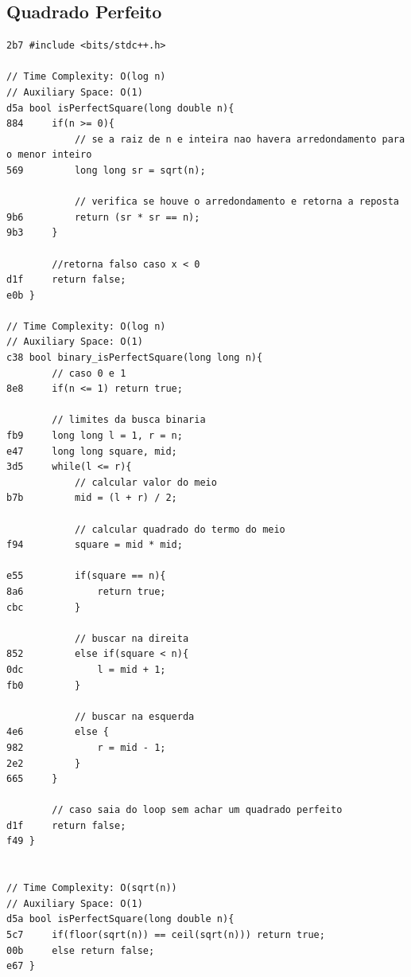 \documentclass[11pt, a4paper, twoside]{article}
\begin{document}
\subsection{Quadrado Perfeito}
\begin{lstlisting}
2b7 #include <bits/stdc++.h>

// Time Complexity: O(log n)
// Auxiliary Space: O(1)
d5a bool isPerfectSquare(long double n){
884     if(n >= 0){
            // se a raiz de n e inteira nao havera arredondamento para o menor inteiro
569         long long sr = sqrt(n);
    
            // verifica se houve o arredondamento e retorna a reposta
9b6         return (sr * sr == n);
9b3     }
    
        //retorna falso caso x < 0
d1f     return false;
e0b }

// Time Complexity: O(log n)
// Auxiliary Space: O(1)
c38 bool binary_isPerfectSquare(long long n){
        // caso 0 e 1
8e8     if(n <= 1) return true;
        
        // limites da busca binaria
fb9     long long l = 1, r = n;
e47     long long square, mid;
3d5     while(l <= r){
            // calcular valor do meio
b7b         mid = (l + r) / 2;
    
            // calcular quadrado do termo do meio
f94         square = mid * mid;
    
e55         if(square == n){
8a6             return true; 
cbc         } 
            
            // buscar na direita
852         else if(square < n){
0dc             l = mid + 1;
fb0         }
            
            // buscar na esquerda
4e6         else {
982             r = mid - 1;
2e2         }
665     }
        
        // caso saia do loop sem achar um quadrado perfeito
d1f     return false;
f49 }


// Time Complexity: O(sqrt(n))
// Auxiliary Space: O(1)
d5a bool isPerfectSquare(long double n){
5c7     if(floor(sqrt(n)) == ceil(sqrt(n))) return true;
00b     else return false;
e67 }
\end{lstlisting}
\end{document}
